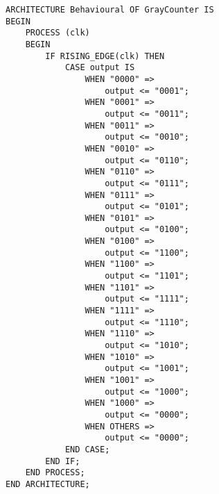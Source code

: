 \documentclass{article}
\begin{document}
\begin{enumerate}
\begin{verbatim}
ARCHITECTURE Behavioural OF GrayCounter IS
BEGIN
    PROCESS (clk)
    BEGIN
        IF RISING_EDGE(clk) THEN
            CASE output IS
                WHEN "0000" => 
                    output <= "0001";
                WHEN "0001" => 
                    output <= "0011";
                WHEN "0011" => 
                    output <= "0010";
                WHEN "0010" => 
                    output <= "0110";
                WHEN "0110" => 
                    output <= "0111";
                WHEN "0111" => 
                    output <= "0101";
                WHEN "0101" => 
                    output <= "0100";
                WHEN "0100" => 
                    output <= "1100";
                WHEN "1100" => 
                    output <= "1101";
                WHEN "1101" => 
                    output <= "1111";
                WHEN "1111" => 
                    output <= "1110";
                WHEN "1110" => 
                    output <= "1010";
                WHEN "1010" => 
                    output <= "1001";
                WHEN "1001" => 
                    output <= "1000";
                WHEN "1000" => 
                    output <= "0000";
                WHEN OTHERS => 
                    output <= "0000";
            END CASE;
        END IF;
    END PROCESS;
END ARCHITECTURE;
      \end{verbatim}

\end{enumerate}
\end{document}
